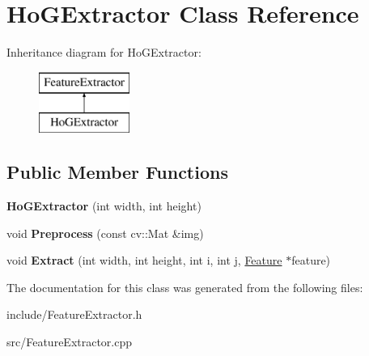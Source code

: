 \hypertarget{classHoGExtractor}{}\section{Ho\+G\+Extractor Class Reference}
\label{classHoGExtractor}
Inheritance diagram for Ho\+G\+Extractor\+:\begin{figure}[H]
\begin{center}
\leavevmode
\includegraphics[height=2.000000cm]{classHoGExtractor}
\end{center}
\end{figure}
\subsection*{Public Member Functions}
\begin{DoxyCompactItemize}
\item 
\hypertarget{classHoGExtractor_acc0ace70caba09e835940c3abdb4965f}{}{\bfseries Ho\+G\+Extractor} (int width, int height)\label{classHoGExtractor_acc0ace70caba09e835940c3abdb4965f}

\item 
\hypertarget{classHoGExtractor_acad10e438c39ed5d9f8e812d3f6f3c80}{}void {\bfseries Preprocess} (const cv\+::\+Mat \&img)\label{classHoGExtractor_acad10e438c39ed5d9f8e812d3f6f3c80}

\item 
\hypertarget{classHoGExtractor_a0fe8f6fe37ff5e18cf27cee49a67dbc4}{}void {\bfseries Extract} (int width, int height, int i, int j, \hyperlink{classFeature}{Feature} $\ast$feature)\label{classHoGExtractor_a0fe8f6fe37ff5e18cf27cee49a67dbc4}

\end{DoxyCompactItemize}


The documentation for this class was generated from the following files\+:\begin{DoxyCompactItemize}
\item 
include/Feature\+Extractor.\+h\item 
src/Feature\+Extractor.\+cpp\end{DoxyCompactItemize}
